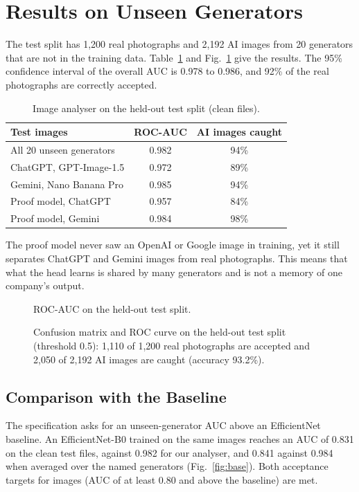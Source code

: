 \section{Results on Unseen Generators}
The test split has 1,200 real photographs and 2,192 AI images from 20 generators that are not in the training data. Table~\ref{tab:main} and Fig.~\ref{fig:auc} give the results. The 95\% confidence interval of the overall AUC is 0.978 to 0.986, and 92\% of the real photographs are correctly accepted.

\begin{table}[htbp]
\centering\small
\caption{Image analyser on the held-out test split (clean files).}\label{tab:main}
\begin{tabular}{lcc}
\toprule
Test images & ROC-AUC & AI images caught\\
\midrule
All 20 unseen generators & 0.982 & 94\%\\
ChatGPT, GPT-Image-1.5 & 0.972 & 89\%\\
Gemini, Nano Banana Pro & 0.985 & 94\%\\
Proof model, ChatGPT & 0.957 & 84\%\\
Proof model, Gemini & 0.984 & 98\%\\
\bottomrule
\end{tabular}
\end{table}

The proof model never saw an OpenAI or Google image in training, yet it still separates ChatGPT and Gemini images from real photographs. This means that what the head learns is shared by many generators and is not a memory of one company's output.

\begin{figure}[htbp]
  \centering
  
  \caption{ROC-AUC on the held-out test split.}\label{fig:auc}
\end{figure}

\begin{figure}[htbp]
  \centering
  \caption{Confusion matrix and ROC curve on the held-out test split (threshold 0.5): 1,110 of 1,200 real photographs are accepted and 2,050 of 2,192 AI images are caught (accuracy 93.2\%).}\label{fig:cm}
\end{figure}

\subsection{Comparison with the Baseline}
The specification asks for an unseen-generator AUC above an EfficientNet baseline. An EfficientNet-B0 \cite{effnet} trained on the same images reaches an AUC of 0.831 on the clean test files, against 0.982 for our analyser, and 0.841 against 0.984 when averaged over the named generators (Fig.~\ref{fig:base}). Both acceptance targets for images (AUC of at least 0.80 and above the baseline) are met.

